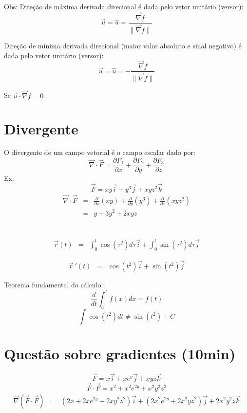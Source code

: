 \documentclass[a4paper,10pt]{book}
\begin{document}
  Obs: Direção de máxima derivada direcional é dada pelo vetor unitário (versor):
  $$\vec{u}=\hat{u}=\frac{\vec{\nabla} f}{\|\vec{\nabla} f\|}$$
 
 Direção de mínima derivada direcional (maior valor absoluto e sinal negativo) é dada pelo vetor unitário (versor):
  $$\vec{u}=\hat{u}=-\frac{\vec{\nabla} f}{\|\vec{\nabla} f\|}$$
 
 Se $\vec{u}\cdot \vec{\nabla}f = 0$

 \section{Divergente}
 O divergente de um campo vetorial é o campo escalar dado por:
 $$\vec{\nabla}\cdot \vec{F} = \frac{\partial F_1}{\partial x}+\frac{\partial F_2}{\partial y}+\frac{\partial F_3}{\partial z}$$
 Ex.
 $$     \vec{F}=xy\vec{i}+y^3\vec{j}+xyz^2\vec{k}$$
  \begin{eqnarray*}
 \vec{\nabla}\cdot\vec{F}&=&\frac{\partial }{\partial x}(xy)+\frac{\partial }{\partial y}(y^3)+\frac{\partial }{\partial z}(xyz^2)\\
 &=&y+ 3y^2+2xyz
 \end{eqnarray*}
 
 
 
 \section{}
 
 \begin{eqnarray*}
\vec{r}(t)&=&\int_0^t\cos(\tau^2)d\tau\vec{i}+\int_0^t\sin(\tau^2)d\tau\vec{j}  
 \end{eqnarray*}

 \begin{eqnarray*}
\vec{r}\!~'(t)&=&\cos(t^2)\vec{i}+\sin(t^2)\vec{j}  
 \end{eqnarray*}

 Teorema fundamental do cálculo:
 $$\frac{d}{dt}\int_a^t f(x)dx = f(t)$$
$$\int\cos(t^2)dt \neq \sin(t^2)+C$$
 
 
 \section{Questão sobre gradientes (10min)}

 $$\vec{F}=x\vec{i}+xe^y\vec{j} + xyz\vec{k}$$ 
$$\vec{F}\cdot \vec{F}=x^2+x^2e^{2y} + x^2y^2z^2$$ 
\begin{eqnarray*}
\vec{\nabla}\left(\vec{F}\cdot\vec{F}\right)&=& \left(2x+2xe^{2y}+2xy^2z^2\right) \vec{i}+
\left(2x^2e^{2y}+2x^2yz^2\right) \vec{j}
+2 x^2y^2z \vec{k}
 \end{eqnarray*}
\end{document}
